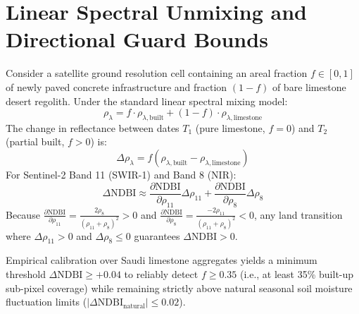 \section{Linear Spectral Unmixing and Directional Guard Bounds}
\label{sec:proof_spectral_bounds}
Consider a satellite ground resolution cell containing an areal fraction $f \in [0, 1]$ of newly paved concrete infrastructure and fraction $(1 - f)$ of bare limestone desert regolith. Under the standard linear spectral mixing model:
\begin{equation}
    \rho_{\lambda} = f \cdot \rho_{\lambda, \text{built}} + (1 - f) \cdot \rho_{\lambda, \text{limestone}}
\end{equation}
The change in reflectance between dates $T_1$ (pure limestone, $f=0$) and $T_2$ (partial built, $f > 0$) is:
\begin{equation}
    \Delta \rho_\lambda = f \left( \rho_{\lambda, \text{built}} - \rho_{\lambda, \text{limestone}} \right)
\end{equation}
For Sentinel-2 Band 11 (SWIR-1) and Band 8 (NIR):
\begin{equation}
    \Delta\text{NDBI} \approx \frac{\partial \text{NDBI}}{\partial \rho_{11}} \Delta \rho_{11} + \frac{\partial \text{NDBI}}{\partial \rho_{8}} \Delta \rho_8
\end{equation}
Because $\frac{\partial \text{NDBI}}{\partial \rho_{11}} = \frac{2 \rho_8}{(\rho_{11} + \rho_8)^2} > 0$ and $\frac{\partial \text{NDBI}}{\partial \rho_{8}} = \frac{-2 \rho_{11}}{(\rho_{11} + \rho_8)^2} < 0$, any land transition where $\Delta \rho_{11} > 0$ and $\Delta \rho_8 \le 0$ guarantees $\Delta\text{NDBI} > 0$. 

Empirical calibration over Saudi limestone aggregates yields a minimum threshold $\Delta\text{NDBI} \ge +0.04$ to reliably detect $f \ge 0.35$ (i.e., at least 35\% built-up sub-pixel coverage) while remaining strictly above natural seasonal soil moisture fluctuation limits ($|\Delta\text{NDBI}_{\text{natural}}| \le 0.02$).
\newpage
